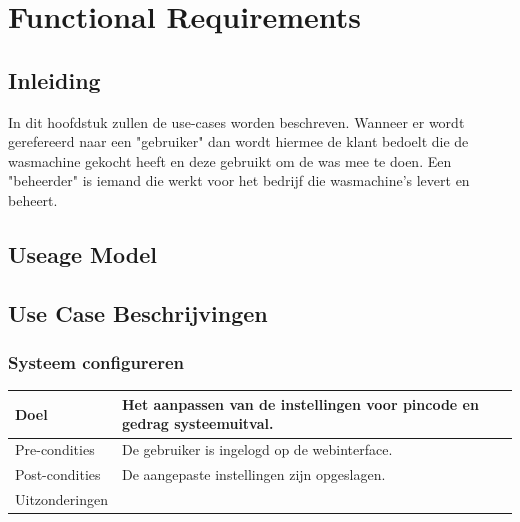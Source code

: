 \chapter{Functional Requirements}
\section{Inleiding}
In dit hoofdstuk zullen de use-cases worden beschreven.
Wanneer er wordt gerefereerd naar een "gebruiker" dan wordt hiermee de klant bedoelt die de wasmachine gekocht heeft en deze gebruikt om de was mee te doen.
Een "beheerder" is iemand die werkt voor het bedrijf die wasmachine's levert en beheert.
\newpage
\section{Useage Model}

  


\section{Use Case Beschrijvingen}

\subsection{Systeem configureren}
\begin{center}
  \begin{tabular}{ | p{4cm} | p{8.5cm} | }    \hline
    Doel & Het aanpassen van de instellingen voor pincode en gedrag systeemuitval. \\ \hline
    Pre-condities & De gebruiker is ingelogd op de webinterface. \\ \hline
    Post-condities & De aangepaste instellingen zijn opgeslagen. \\ \hline
    Uitzonderingen & \\
    \hline
  \end{tabular}
\end{center}

